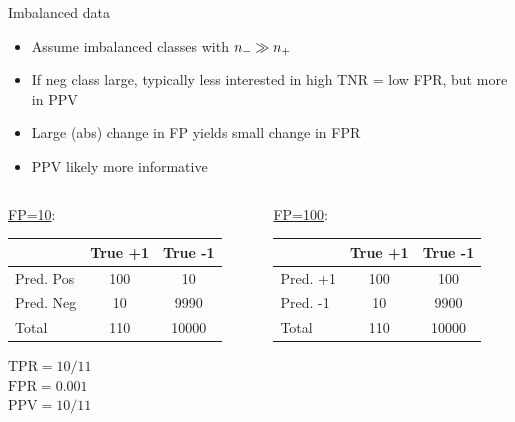 \documentclass[11pt,compress,t,notes=noshow, xcolor=table]{beamer}
\begin{document}
\begin{vbframe}{Imbalanced data}

\begin{itemize}
     \item Assume imbalanced classes with $n_{-} \gg n_{+}$
     \item If neg class large, typically less interested in high TNR = low FPR,
     but more in PPV
     \item Large (abs) change in FP yields small change in FPR
  \item PPV likely more informative
\end{itemize}

\lz

\begin{columns}
 \begin{column}{0.45\textwidth}
 \underline{FP=10}:\\
 \lz
 {
 \tiny
 \centering
 \tiny
 \begin{tabular}{|l|c|c|}
                 \hline
                & True +1 & True -1 \\ \hline
 Pred. Pos & 100            & 10            \\ \hline
 Pred. Neg & 10            & 9990           \\ \hline
 Total  & 110            & 10000           \\ \hline
 \end{tabular}
 }

 \medskip
 $\text{TPR} = 10/11$\\
 $\text{FPR} = 0.001$\\
 $\text{PPV} = 10/11$
\end{column}
\begin{column}{0.45\textwidth}
 \underline{FP=100}:\\
 \lz
 {
 \tiny
 \begin{tabular}{|l|c|c|}
                 \hline
                & True +1 & True -1 \\ \hline
 Pred. +1 & 100            & 100            \\ \hline
 Pred. -1 & 10            & 9900           \\ \hline
 Total  & 110            & 10000           \\ \hline
 \end{tabular}
 }


\end{column}
\end{columns}
\end{vbframe}
\end{document}
